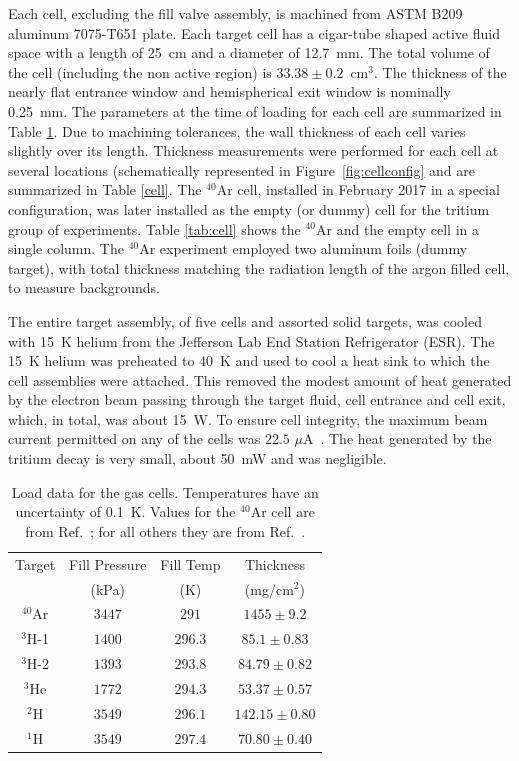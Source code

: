 \documentclass[final,5p,times,twocolumn]{elsarticle}
\begin{document}
Each cell, excluding the fill valve assembly, is machined from ASTM B209 aluminum 7075-T651 plate. Each target cell has a cigar-tube shaped 
active fluid space with a length of 25~cm and a diameter of 12.7~mm. The total volume of the cell (including the non active region) 
is $33.38 \pm 0.2$~cm$^{3}$. The thickness of the nearly flat entrance window and hemispherical exit window is nominally 0.25~mm. 
The parameters at the time of loading for each cell are summarized in Table \ref{tab:fill_tar}. Due to machining tolerances, the 
wall thickness of each cell varies slightly over its length. Thickness measurements were performed for each cell at several 
locations (schematically represented in Figure~\ref{fig:cellconfig} and are summarized in Table \ref{cell}. The $^{40}$Ar cell, 
installed in February 2017 in a special configuration, was later installed as the empty (or dummy) cell for the tritium group 
of experiments. Table \ref{tab:cell} shows the $^{40}$Ar and the empty cell in a single column. The $^{40}$Ar experiment 
employed two aluminum foils (dummy target), with total thickness matching the radiation length of the argon filled cell, 
to measure backgrounds.

The entire target assembly, of five cells and assorted solid targets, was cooled with 15~K helium from 
the Jefferson Lab End Station Refrigerator (ESR). The 15~K helium was preheated to 40~K and used to cool 
a heat sink to which the cell assemblies were attached. This removed the modest amount of heat generated 
by the electron beam passing through the target fluid, cell entrance and cell exit, which, in total, 
was about 15~W.  To ensure cell integrity, the maximum beam current permitted on any of the cells was $22.5$ $\mu$A~\cite{engreport}. 
The heat generated by the tritium decay is very small, about 50~mW and was negligible.

\begin{table}[!h]
\centering
\begin{adjustbox}{width=0.5\textwidth}
\begin{tabular}{|c|c|c|c|}
	\hline 
	Target       & Fill Pressure & Fill Temp    & Thickness \\
	     		 &	(kPa)		 &	(K) 	    & (mg/cm$^2$) \\
	\hline 
	$^{40}$Ar	 & $3447$ 		 & $291$	    &  $1455\pm9.2$ \\ 
	\hline 
	$^{3}$H-1 	 & $1400$		 & $296.3$	    &  $85.1\pm 0.83$ \\ 
	\hline 
	$^{3}$H-2	 & $1393$		 & $293.8$		&  $84.79\pm0.82$ \\
	\hline
	$^{3}$He	 & $1772$		 & $294.3$	    &  $53.37\pm0.57$ \\ 
	\hline 
	$^{2}$H 	 & $3549$		 & $296.1$	    &  $142.15\pm0.80$ \\ 
	\hline 
	$^{1}$H 	 & $3549$		 & $297.4$	    &  $70.80\pm0.40$ \\ 
	\hline 
\end{tabular}
\end{adjustbox}
\caption{Load data for the gas cells. Temperatures have an uncertainty of 0.1~K.  Values for the $^{40}$Ar 
         cell are from Ref.~\cite{ar_config}; for all others they are from Ref.~\cite{cellconfig}.}
\label{tab:fill_tar}
\end{table}
\end{document}
